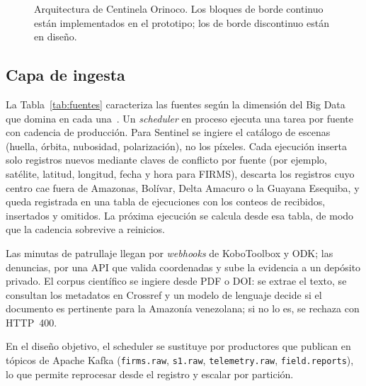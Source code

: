 \documentclass[conference]{IEEEtran}
\begin{document}
\begin{figure}[!t]
\caption{Arquitectura de Centinela Orinoco. Los bloques de borde continuo están implementados en el prototipo; los de borde discontinuo están en diseño.}
\label{fig:arq}
\end{figure}

\subsection{Capa de ingesta}
La Tabla~\ref{tab:fuentes} caracteriza las fuentes según la dimensión del Big Data que domina en cada una~\cite{arafat2025}. Un \emph{scheduler} en proceso ejecuta una tarea por fuente con cadencia de producción. Para Sentinel se ingiere el catálogo de escenas (huella, órbita, nubosidad, polarización), no los píxeles. Cada ejecución inserta solo registros nuevos mediante claves de conflicto por fuente (por ejemplo, satélite, latitud, longitud, fecha y hora para FIRMS), descarta los registros cuyo centro cae fuera de Amazonas, Bolívar, Delta Amacuro o la Guayana Esequiba, y queda registrada en una tabla de ejecuciones con los conteos de recibidos, insertados y omitidos. La próxima ejecución se calcula desde esa tabla, de modo que la cadencia sobrevive a reinicios.

Las minutas de patrullaje llegan por \emph{webhooks} de KoboToolbox y ODK; las denuncias, por una API que valida coordenadas y sube la evidencia a un depósito privado. El corpus científico se ingiere desde PDF o DOI: se extrae el texto, se consultan los metadatos en Crossref y un modelo de lenguaje decide si el documento es pertinente para la Amazonía venezolana; si no lo es, se rechaza con HTTP~400.

En el diseño objetivo, el scheduler se sustituye por productores que publican en tópicos de Apache Kafka (\texttt{firms.raw}, \texttt{s1.raw}, \texttt{telemetry.raw}, \texttt{field.reports}), lo que permite reprocesar desde el registro y escalar por partición.
\end{document}
